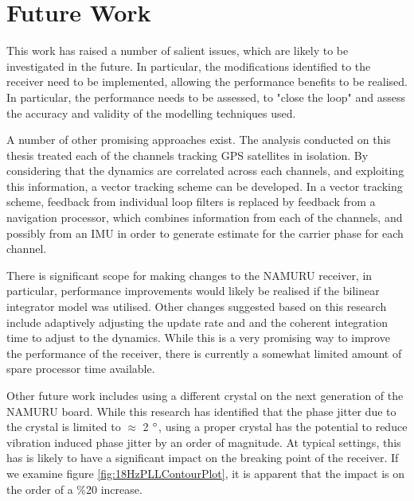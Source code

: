 
\chapter{Future Work}
This work has raised a number of salient issues, which are likely to be investigated in the future. In particular, the modifications identified to the receiver need to be implemented, allowing the performance benefits to be realised. In particular, the performance needs to be assessed, to "close the loop" and assess the accuracy and validity of the modelling techniques used.

A number of other promising approaches exist. The analysis conducted on this thesis treated each of the channels tracking GPS satellites in isolation. By considering that the dynamics are correlated across each channels, and exploiting this information, a vector tracking scheme can be developed. In a vector tracking scheme, feedback from individual loop filters is replaced by feedback from a navigation processor, which combines information from each of the channels, and possibly from an IMU in order to generate estimate for the carrier phase for each channel. 

There is significant scope for making changes to the \ac{NAMURU} receiver, in particular, performance improvements would likely be realised if the bilinear integrator model was utilised. Other changes suggested based on this research include adaptively adjusting the update rate and and the coherent integration time to adjust to the dynamics. While this is a very promising way to improve the performance of the receiver, there is currently a somewhat limited amount of spare processor time available. 

Other future work includes using a different crystal on the next generation of the NAMURU board. While this research has identified that the phase jitter due to the crystal is limited to $\approx$ 2 $\degree$, using a proper crystal has the potential to reduce vibration induced phase jitter by an order of magnitude. At typical settings, this has is likely to have a significant impact on the breaking point of the receiver. If we examine figure \ref{fig:18HzPLLContourPlot}, it is apparent that the impact is on the order of a \%20 increase.











